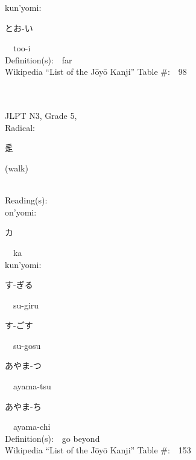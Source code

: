 \begin{multicols}{2}
{\hspace*{1em}}kun'yomi:\ \ \\
{\hspace*{2em}}{\begin{CJK}{UTF8}{min} とお-い \end{CJK}}\ \ too-i\ \ \\
Definition(s):\ \ far \\
Wikipedia ``List of the J\=oy\=o Kanji'' Table \#:\ \ 98 \\
\ \ \\
{\fontsize{34pt}{40pt}  }\ \ \\  %
{JLPT N3, Grade 5, \\Radical:\ \ {\begin{CJK}{UTF8}{min} 辵 \end{CJK}} (walk) } \\
Reading(s):\ \ \\
{\hspace*{1em}}on'yomi:\ \ \\
{\hspace*{2em}}{\begin{CJK}{UTF8}{min} カ \end{CJK}}\ \ ka\ \ \\
{\hspace*{1em}}kun'yomi:\ \ \\
{\hspace*{2em}}{\begin{CJK}{UTF8}{min} す-ぎる \end{CJK}}\ \ su-giru\ \ \\
{\hspace*{2em}}{\begin{CJK}{UTF8}{min} す-ごす \end{CJK}}\ \ su-gosu\ \ \\
{\hspace*{2em}}{\begin{CJK}{UTF8}{min} あやま-つ \end{CJK}}\ \ ayama-tsu\ \ \\
{\hspace*{2em}}{\begin{CJK}{UTF8}{min} あやま-ち \end{CJK}}\ \ ayama-chi\ \ \\
Definition(s):\ \ go beyond \\
Wikipedia ``List of the J\=oy\=o Kanji'' Table \#:\ \ 153 \\

\end{multicols}
